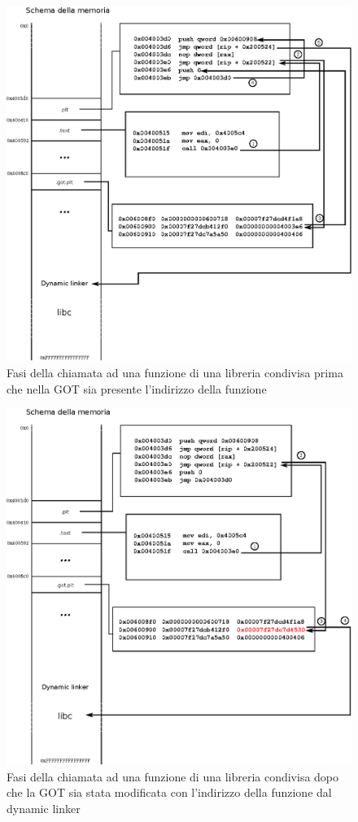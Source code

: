\begin{figure}
\includegraphics{plt_got_printf_diritta_prima} 
\caption{Fasi della chiamata ad una funzione di una libreria condivisa
  prima che nella GOT sia presente l'indirizzo della funzione}
\label{fig:got_plt_prima}
\end{figure}

\begin{figure}
\includegraphics{plt_got_printf_diritta_seconda}
\caption{Fasi della chiamata ad una funzione di una libreria condivisa
  dopo che la GOT sia stata modificata con l'indirizzo della funzione
  dal dynamic linker}
\label{fig:got_plt_seconda}
\end{figure}


